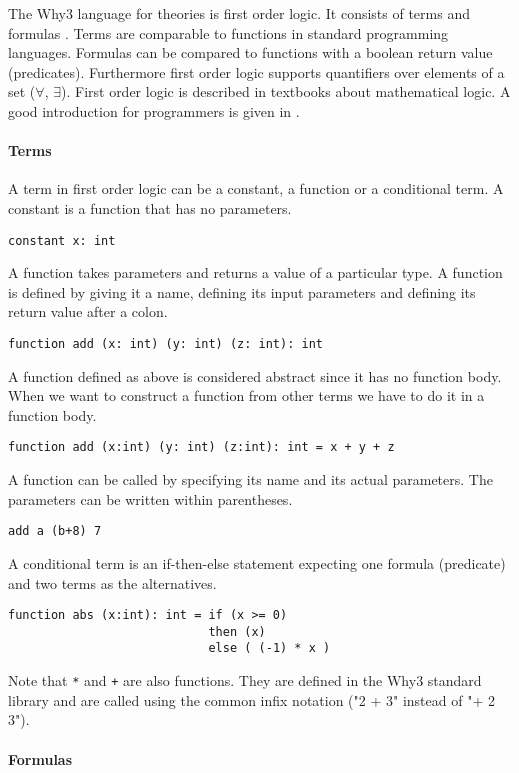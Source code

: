 The Why3 language for theories is first order logic. It consists of terms
and formulas \cite[p. 739]{smt}. Terms are comparable to functions in
standard programming languages. Formulas can be compared to functions with
a boolean return value (predicates). Furthermore first order logic 
supports quantifiers over elements of a set ($\forall$, $\exists$).
First order logic is described in textbooks about mathematical logic. A
good introduction for programmers is given in \cite[p. 135--150]{spark14}.

\paragraph{Terms}

A term in first order logic can be a constant, a function or a conditional
term. A constant is a function that has no parameters. 
\begin{lstlisting}
constant x: int
\end{lstlisting}
A function takes parameters and returns a value of a particular type.
A function is defined by giving it a name, defining its input parameters 
and defining its return value after a colon.
\begin{lstlisting}
function add (x: int) (y: int) (z: int): int
\end{lstlisting}
A function defined as above is considered abstract since it has no
function body. When we want to construct a function from other terms we 
have to do it in a function body.
\begin{lstlisting}
function add (x:int) (y: int) (z:int): int = x + y + z
\end{lstlisting}
A function can be called by specifying its name and its actual parameters.
The parameters can be written within parentheses.
\begin{lstlisting}
add a (b+8) 7
\end{lstlisting}
A conditional term is an if-then-else statement expecting one formula 
(predicate) and two terms as the alternatives.
\begin{lstlisting}
function abs (x:int): int = if (x >= 0) 
                            then (x) 
                            else ( (-1) * x )
\end{lstlisting}
Note that \verb"*" and \verb"+" are also functions. They are defined in the Why3 
standard library and are called using the common infix notation
("2 + 3" instead of "+ 2 3"). 

\paragraph{Formulas}

